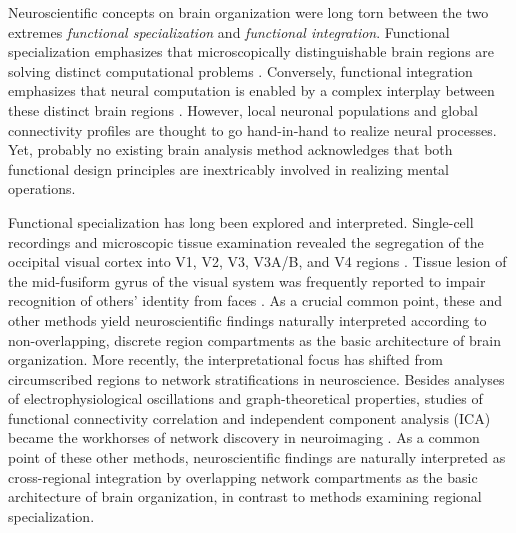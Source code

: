 \documentclass[runningheads,a4paper]{llncs}
\begin{document}
Neuroscientific concepts on brain organization were long torn
between the two extremes
\textit{functional specialization} and \textit{functional integration}.
Functional specialization emphasizes that microscopically distinguishable
brain regions are solving distinct computational problems
\cite{kanwisher2010functional}.
Conversely, functional integration emphasizes that neural computation
is enabled by a complex interplay between these
distinct brain regions \cite{sporns14nn}.
%
However,
local
neuronal populations
and global connectivity profiles are thought to go hand-in-hand
to realize neural processes.
%
Yet,
probably no existing brain analysis method acknowledges that
both functional design principles are inextricably involved
in realizing mental operations.

%
Functional specialization has long been
explored and interpreted.
%
Single-cell recordings and microscopic tissue examination
revealed the
segregation of the occipital visual cortex into V1, V2, V3, V3A/B, and V4
regions
\cite{zeki1978functional}.
Tissue lesion of the mid-fusiform gyrus of the visual system
was frequently reported to impair
recognition of others' identity from faces
\cite{iaria2008contrib}.
%
As a crucial common point,
these and other methods
yield neuroscientific findings
naturally interpreted according to
non-overlapping, discrete region compartments
as the basic architecture of brain organization.
More recently,
the interpretational focus has shifted
from circumscribed regions to network stratifications
in neuroscience.
%
Besides analyses of
electrophysiological oscillations
and
graph-theoretical properties,
studies of
functional connectivity correlation and
independent component analysis (ICA)
became the workhorses of network discovery
in neuroimaging \cite{beckmann2005}.
%
As a common point of these other methods,
neuroscientific findings are naturally interpreted as
cross-regional integration by
overlapping network compartments
as the basic architecture of brain organization,
in contrast to methods examining regional specialization.
\end{document}
